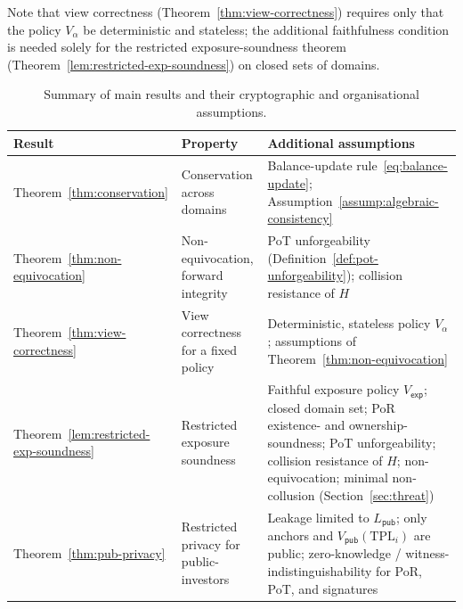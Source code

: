\documentclass[11pt]{article}
\begin{document}
Note that view correctness (Theorem~\ref{thm:view-correctness}) requires only that the policy $V_\alpha$ be
deterministic and stateless; the additional faithfulness condition is needed solely for the restricted
exposure-soundness theorem (Theorem~\ref{lem:restricted-exp-soundness}) on closed sets of domains.

\begin{table}[H]
\centering
\begin{tabularx}{\textwidth}{@{}l l X@{}}
\toprule
Result & Property & Additional assumptions \\
\midrule
Theorem~\ref{thm:conservation} & Conservation across domains &
Balance-update rule~\eqref{eq:balance-update}; Assumption~\ref{assump:algebraic-consistency} \\
Theorem~\ref{thm:non-equivocation} & Non-equivocation, forward integrity &
PoT unforgeability (Definition~\ref{def:pot-unforgeability}); collision resistance of $H$ \\
Theorem~\ref{thm:view-correctness} & View correctness for a fixed policy &
Deterministic, stateless policy $V_\alpha$; assumptions of Theorem~\ref{thm:non-equivocation} \\
Theorem~\ref{lem:restricted-exp-soundness} & Restricted exposure soundness &
Faithful exposure policy $V_{\mathsf{exp}}$; closed domain set; PoR existence- and ownership-soundness; PoT unforgeability; collision resistance of $H$; non-equivocation; minimal non-collusion (Section~\ref{sec:threat}) \\
Theorem~\ref{thm:pub-privacy} & Restricted privacy for public-investors &
Leakage limited to $L_{\mathsf{pub}}$; only anchors and $V_{\mathsf{pub}}(\mathrm{TPL}_i)$ are public; zero-knowledge / witness-indistinguishability for PoR, PoT, and signatures \\
\bottomrule
\end{tabularx}
\caption{Summary of main results and their cryptographic and organisational assumptions.}
\label{tab:assumption-map}
\end{table}
\end{document}
